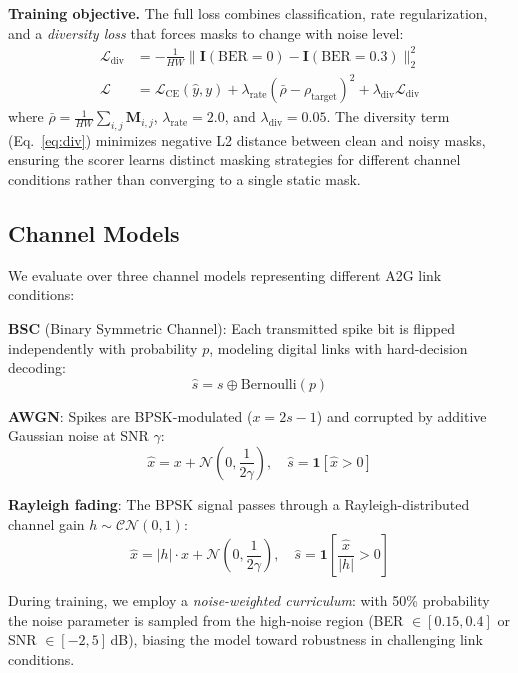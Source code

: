 \documentclass[conference]{IEEEtran}
\begin{document}
\textbf{Training objective.} The full loss combines classification, rate regularization, and a \emph{diversity loss} that forces masks to change with noise level:
\begin{align}
    \mathcal{L}_{\text{div}} &= -\frac{1}{HW}\|\mathbf{I}(\text{BER}{=}0) - \mathbf{I}(\text{BER}{=}0.3)\|_2^2 \label{eq:div}\\
    \mathcal{L} &= \mathcal{L}_{\text{CE}}(\hat{y}, y) + \lambda_{\text{rate}} \left(\bar{\rho} - \rho_{\text{target}}\right)^2 + \lambda_{\text{div}} \mathcal{L}_{\text{div}}
    \label{eq:loss}
\end{align}
where $\bar{\rho} = \frac{1}{HW}\sum_{i,j}\mathbf{M}_{i,j}$, $\lambda_{\text{rate}} = 2.0$, and $\lambda_{\text{div}} = 0.05$. The diversity term (Eq.~\ref{eq:div}) minimizes negative L2 distance between clean and noisy masks, ensuring the scorer learns distinct masking strategies for different channel conditions rather than converging to a single static mask.

\subsection{Channel Models}

We evaluate over three channel models representing different A2G link conditions:

\textbf{BSC} (Binary Symmetric Channel): Each transmitted spike bit is flipped independently with probability $p$, modeling digital links with hard-decision decoding:
\begin{equation}
    \hat{s} = s \oplus \text{Bernoulli}(p)
\end{equation}

\textbf{AWGN}: Spikes are BPSK-modulated ($x = 2s - 1$) and corrupted by additive Gaussian noise at SNR $\gamma$:
\begin{equation}
    \hat{x} = x + \mathcal{N}\!\left(0, \frac{1}{2\gamma}\right), \quad \hat{s} = \mathbf{1}[\hat{x} > 0]
\end{equation}

\textbf{Rayleigh fading}: The BPSK signal passes through a Rayleigh-distributed channel gain $h \sim \mathcal{CN}(0,1)$:
\begin{equation}
    \hat{x} = |h| \cdot x + \mathcal{N}\!\left(0, \frac{1}{2\gamma}\right), \quad \hat{s} = \mathbf{1}\!\left[\frac{\hat{x}}{|h|} > 0\right]
\end{equation}

During training, we employ a \emph{noise-weighted curriculum}: with 50\% probability the noise parameter is sampled from the high-noise region (BER $\in [0.15, 0.4]$ or SNR $\in [-2, 5]$\,dB), biasing the model toward robustness in challenging link conditions.
\end{document}
